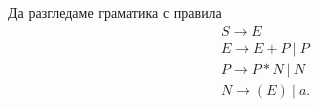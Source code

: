 \begin{example}
  Да разгледаме граматика с правила
  \begin{align*}
    & S \to E\\
    & E \to E + P\ |\ P\\
    & P \to P * N\ |\ N\\
    & N \to (E)\ |\ a.
  \end{align*}
\end{example}




